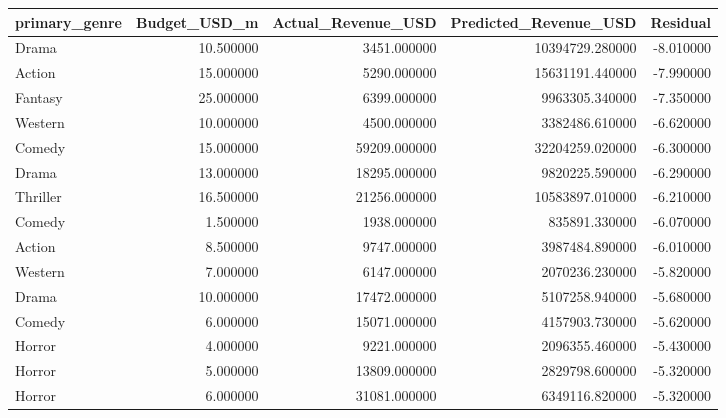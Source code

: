 \begin{tabular}{lrrrr}
\toprule
primary\_genre & Budget\_USD\_m & Actual\_Revenue\_USD & Predicted\_Revenue\_USD & Residual \\
\midrule
Drama & 10.500000 & 3451.000000 & 10394729.280000 & -8.010000 \\
Action & 15.000000 & 5290.000000 & 15631191.440000 & -7.990000 \\
Fantasy & 25.000000 & 6399.000000 & 9963305.340000 & -7.350000 \\
Western & 10.000000 & 4500.000000 & 3382486.610000 & -6.620000 \\
Comedy & 15.000000 & 59209.000000 & 32204259.020000 & -6.300000 \\
Drama & 13.000000 & 18295.000000 & 9820225.590000 & -6.290000 \\
Thriller & 16.500000 & 21256.000000 & 10583897.010000 & -6.210000 \\
Comedy & 1.500000 & 1938.000000 & 835891.330000 & -6.070000 \\
Action & 8.500000 & 9747.000000 & 3987484.890000 & -6.010000 \\
Western & 7.000000 & 6147.000000 & 2070236.230000 & -5.820000 \\
Drama & 10.000000 & 17472.000000 & 5107258.940000 & -5.680000 \\
Comedy & 6.000000 & 15071.000000 & 4157903.730000 & -5.620000 \\
Horror & 4.000000 & 9221.000000 & 2096355.460000 & -5.430000 \\
Horror & 5.000000 & 13809.000000 & 2829798.600000 & -5.320000 \\
Horror & 6.000000 & 31081.000000 & 6349116.820000 & -5.320000 \\
\bottomrule
\end{tabular}

